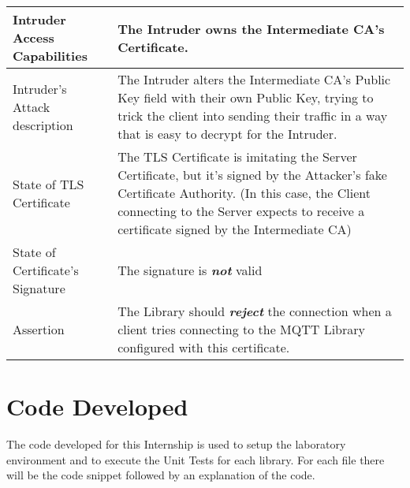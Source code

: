 \documentclass[binding=0.6cm,noexaminfo]{sapthesis}
\begin{document}
\begin{center}
\begin{tabular}{| p{6cm} | p{6cm} |}
\hline
Intruder Access Capabilities & The Intruder owns the Intermediate CA’s Certificate. \\
\hline
Intruder’s Attack description & The Intruder alters the Intermediate CA’s Public Key field with their own Public Key, trying to trick the client into sending their traffic in a way that is easy to decrypt for the Intruder. \\
\hline
State of TLS Certificate & The TLS Certificate is imitating the Server Certificate, but it’s signed by the Attacker’s fake Certificate Authority. (In this case, the Client connecting to the Server expects to receive a certificate signed by the Intermediate CA) \\
\hline
State of Certificate’s Signature & The signature is \textbf{\textit{not}} valid \\
\hline
Assertion & The Library should \textbf{\textit{reject}} the connection when a client tries connecting to the MQTT Library configured with this certificate. \\
\hline
\end{tabular}
\end{center}

\chapter{Code Developed}
The code developed for this Internship is used to setup the laboratory environment and to execute the Unit Tests for each library. For each file there will be the code snippet followed by an explanation of the code.
\end{document}
